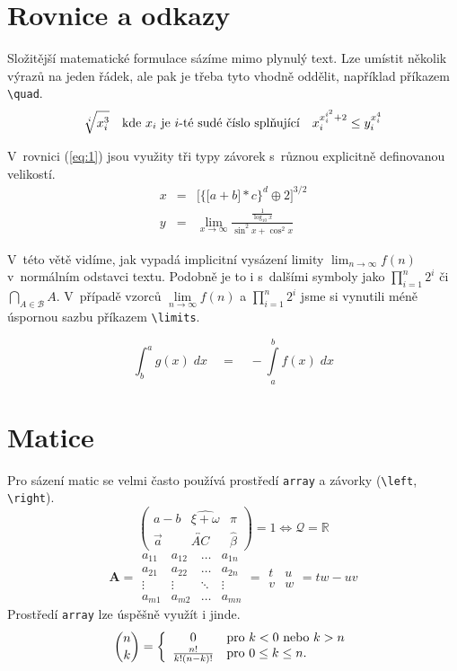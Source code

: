 \documentclass[11pt,a4paper,twocolumn]{article}
\begin{document}
\section{Rovnice a odkazy}
Složitější matematické formulace sázíme mimo plynulý text. Lze umístit několik výrazů na jeden řádek, ale pak je třeba tyto vhodně oddělit, například příkazem \verb|\quad|.
$$\sqrt[i]{x_i^3}\textup{\quad kde } x_i \textup{ je } i \textup{-té sudé číslo splňující}\quad x_i^{x_i^{i^2}+2}\leq y_i^{x_i^4}$$

V~rovnici (\ref{eq:1}) jsou využity tři typy závorek s~různou explicitně definovanou velikostí.
\begin{eqnarray}\label{eq:1}
        x & = & \bigg[ \Big\{ \big[ a + b \big] \ast c \Big\}^d \oplus 2 \bigg]^{3/2}
        \\
        y & = & \lim_{x\to \infty} \frac{\frac{1}{\log_{10} x}}{\sin^2 x + \cos^2 x} \nonumber
\end{eqnarray}

V~této větě vidíme, jak vypadá implicitní vysázení limity $\lim_{n\to\infty} f(n)$ v~normálním odstavci textu. Podobně je to i s~dalšími symboly jako $\prod _{i=1}^n 2^i$ či $\bigcap _{A\in \mathcal{B}} A$. V~případě vzorců $\lim\limits_{n\to\infty} f(n)$ a $\prod\limits _{i=1}^n 2^i$ jsme si vynutili méně úspornou sazbu příkazem \verb|\limits|.

\begin{equation}
    \int _b^a g(x)\;dx \quad = \quad - \int\limits_a^b f(x)\;dx
\end{equation}

\section{Matice}
Pro sázení matic se velmi často používá prostředí \verb|array| a závorky (\verb|\left|, \verb|\right|).
$$
\left( \begin{array}{ccc} 
     a - b & \widehat{\xi + \omega} & \pi  \\
     \Vec{a} & \overleftrightarrow {AC} & \hat{\beta} 
\end{array} \right) = 1 \iff \mathcal{Q} = \mathbb{R}
$$
$$
\textbf{A}= \begin{array}{||cccc||}
    a_{11} & a_{12} & \dots & a_{1n} \\
    a_{21} & a_{22} & \dots & a_{2n} \\
    \vdots & \vdots & \ddots & \vdots \\
    a_{m1} & a_{m2} & \dots & a_{mn}
\end{array} = \begin{array}{|cc|}
    t & u \\
    v & w
\end{array} = tw-uv
$$
\quad Prostředí \verb|array| lze úspěšně využít i jinde.
$$
\binom{n}{k} = \left\{ \begin{array}{c l}
      0 & \mbox{pro } k<0 \mbox{ nebo } k>n\\
      \frac{n!}{k!(n-k)!} & \mbox{pro } 0 \le k \le n.
\end{array}\right.
$$
\end{document}
